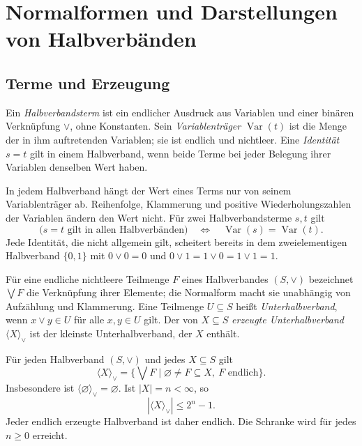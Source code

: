 \chapter{Normalformen und Darstellungen von Halbverbänden}
\label{b45guide:ch:semilattices}

\section{Terme und Erzeugung}

\begin{definition}
Ein \emph{Halbverbandsterm} ist ein endlicher Ausdruck aus Variablen
und einer binären Verknüpfung $\vee$, ohne Konstanten.
Sein \emph{Variablenträger} $\operatorname{Var}(t)$ ist die Menge
der in ihm auftretenden Variablen; sie ist endlich und nichtleer.
Eine \emph{Identität} $s=t$ gilt in einem Halbverband, wenn beide
Terme bei jeder Belegung ihrer Variablen denselben Wert haben.
\end{definition}

\begin{theorem}
\label{b45guide:thm:support}
In jedem Halbverband hängt der Wert eines Terms nur von seinem
Variablenträger ab. Reihenfolge, Klammerung und positive
Wiederholungszahlen der Variablen ändern den Wert nicht.
Für zwei Halbverbandsterme $s,t$ gilt
\[
 \bigl(s=t\text{ gilt in allen Halbverbänden}\bigr)
 \quad\Longleftrightarrow\quad
 \operatorname{Var}(s)=\operatorname{Var}(t).
\]
Jede Identität, die nicht allgemein gilt, scheitert bereits in
dem zweielementigen Halbverband $\{0,1\}$ mit
$0\vee0=0$ und $0\vee1=1\vee0=1\vee1=1$. \cite{smith}
\end{theorem}

\begin{definition}
Für eine endliche nichtleere Teilmenge $F$ eines Halbverbandes
$(S,\vee)$ bezeichnet $\bigvee F$ die Verknüpfung ihrer Elemente;
die Normalform macht sie unabhängig von Aufzählung und Klammerung.
Eine Teilmenge $U\subseteq S$ heißt \emph{Unterhalbverband}, wenn
$x\vee y\in U$ für alle $x,y\in U$ gilt.
Der von $X\subseteq S$ \emph{erzeugte Unterhalbverband}
$\langle X\rangle_{\vee}$ ist der kleinste Unterhalbverband, der $X$ enthält.
\end{definition}

\begin{theorem}
\label{b45guide:thm:semigen}
Für jeden Halbverband $(S,\vee)$ und jedes $X\subseteq S$ gilt
\[
 \langle X\rangle_{\vee}
   =\{\bigvee F\mid \varnothing\ne F\subseteq X,\ F\text{ endlich}\}.
\]
Insbesondere ist $\langle\varnothing\rangle_{\vee}=\varnothing$.
Ist $|X|=n<\infty$, so
\[
 |\langle X\rangle_{\vee}|\leq 2^n-1.
\]
Jeder endlich erzeugte Halbverband ist daher endlich. Die Schranke
wird für jedes $n\geq0$ erreicht. \cite{smith,supclosed}
\end{theorem}

